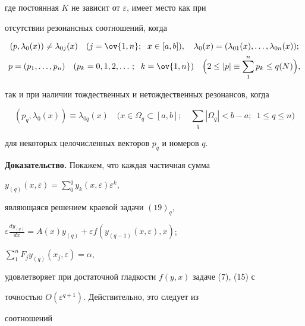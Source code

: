 \begin{thm}
\begin{equation}
\end{equation} 


где постоянная $K$ не зависит от $\varepsilon$, имеет место как при 


отсутствии резонансных соотношений, когда 


\begin{gather*} 


(p,\lambda_0(x))\ne \lambda_{0j}(x)\quad 


(j=\ov{1,n};\ \; x\in[a,b]),\quad 


\lambda_0(x)=(\lambda_{01}(x),\dotsc,\lambda_{0n}(x));\\ 


p=(p_1,\dotsc,p_n)\quad (p_k=0,1,2,\dotsc;\ \; k=\ov{1,n})\quad 


\Big(2\le|p|\equiv\sum^n_1 p_k\le q(N)\Big), 


\end{gather*} 


так и при наличии тождественных и нетождественных резонансов, когда 


$$ 


(p_q,\lambda_0(x))\equiv\lambda_{0q}(x)\quad 


\Big(x\in\Omega_q\subset[a,b];\quad 


\sum_q|\Omega_q|<b-a;\ \; 1\le q\le n\Big) 


$$ 


для некоторых целочисленных векторов $p_q$ и номеров $q$. 


\end{thm} 


 


{\bf Доказательство.} Покажем, что каждая частичная сумма 


$y_{(q)}(x,\varepsilon)= 


\sum\limits^q_0 y_k(x,\varepsilon)\varepsilon^k$, 


являющаяся решением краевой задачи $(19)_q$, 


$\varepsilon\frac{dy_{(q)}}{dx}=A(x)y_{(q)}+\varepsilon 


f(y_{(q-1)}(x,\varepsilon),x)$;


$\sum\limits^n_1 F_j y_{(q)}(x_j,\varepsilon)=\alpha$,


удовлетворяет при достаточной гладкости $f(y,x)$ задаче (7), (15) с 


точностью $O(\varepsilon^{q+1})$. Действительно, это следует из 


соотношений 


